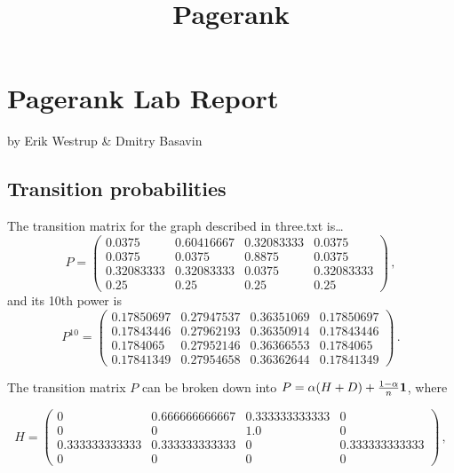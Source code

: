 \documentclass{tufte-handout}
\title{\sf Pagerank}
\begin{document}
\maketitle

\section{Pagerank Lab Report}

by Erik Westrup \& Dmitry Basavin

\subsection{Transition probabilities}

The transition matrix for the graph described in three.txt
is\ldots
\begin{equation*}
P = 
\left(
\begin{array}{cccc}
0.0375      & 0.60416667  & 0.32083333  & 0.0375\\
0.0375      & 0.0375      & 0.8875      & 0.0375\\
0.32083333  & 0.32083333  & 0.0375      & 0.32083333\\
0.25        & 0.25        & 0.25        & 0.25
\end{array}
\right)\,,
\end{equation*}
and its 10th power is
\begin{equation*}
P^{10} = 
\left(
\begin{array}{cccc}
0.17850697  & 0.27947537  & 0.36351069  & 0.17850697\\
0.17843446  & 0.27962193  & 0.36350914  & 0.17843446\\
0.1784065   & 0.27952146  & 0.36366553  & 0.1784065 \\
0.17841349  & 0.27954658  & 0.36362644  & 0.17841349
\end{array}
\right)\,.
\end{equation*}

The transition matrix $P$ can be broken down into  $P = \alpha(H + D)
+ \frac{1-\alpha}{n} \bf 1$, where 

\begin{equation*}
H =
\left(
\begin{array}{cccc}
0 & 0.666666666667 & 0.333333333333 & 0 \\
0 & 0 & 1.0 & 0 \\
0.333333333333 & 0.333333333333 & 0 & 0.333333333333 \\
0 & 0 & 0 & 0
\end{array}
\right)\,,
\end{equation*}
\end{document}
